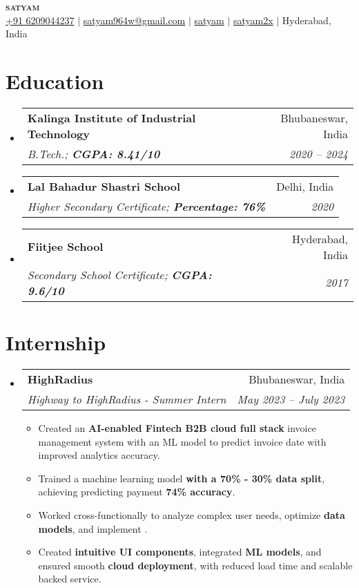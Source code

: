 \documentclass[letterpaper,10pt]{article}
\makeatletter
\newcommand{\resumeItem}[1]{
  \item\normalsize{
    {#1 \vspace{-2pt}}
  }
}
\newcommand{\resumeSubheading}[4]{
  \vspace{-2pt}\item
    \begin{tabular*}{0.97\textwidth}[t]{l@{\extracolsep{\fill}}r}
      \normalsize\textbf{#1} & \normalsize#2 \\
      \normalsize\textit{#3} & \normalsize\textit{#4} \\
    \end{tabular*}\vspace{-7pt}
}
\newcommand{\resumeEducationHeading}[4]{
  \vspace{-2pt}\item
    \begin{tabular*}{0.97\textwidth}[t]{l@{\extracolsep{\fill}}r}
      \normalsize\textbf{#1} & \normalsize#2 \\
      \normalsize\textit{#3} & \normalsize\textit{#4} \\
    \end{tabular*}\vspace{-5pt}
}
\newcommand{\resumeSubHeadingListStart}{\begin{itemize}[leftmargin=0.15in, label={}]}
\newcommand{\resumeSubHeadingListEnd}{\end{itemize}}
\newcommand{\resumeItemListStart}{\begin{itemize}}
\newcommand{\resumeItemListEnd}{\end{itemize}\vspace{-5pt}}
\makeatother
\begin{document}
\begin{center}
    \textbf{\Huge \scshape satyam} \\ \vspace{3pt}
    \normalsize
    \faMobile \hspace{.5pt} \href{tel:6209044237}{+91 6209044237}
    $|$
    \faAt \hspace{.5pt} \href{mailto:satyam964w@gmail.com}{satyam964w@gmail.com}
    $|$
    \faLinkedinSquare \hspace{.5pt} \href{https://www.linkedin.com/in/satyamw/}{satyam}
    $|$
    \faGithub \hspace{.5pt} \href{https://github.com/satyam2x}{satyam2x}
    $|$
    \faMapMarker \hspace{.5pt} Hyderabad, India

\end{center}

\section{Education}
  \vspace{1pt}
  \resumeSubHeadingListStart
    \resumeEducationHeading
      {Kalinga Institute of Industrial Technology}{Bhubaneswar, India}
      {B.Tech.; \textbf{CGPA: 8.41/10}}{2020 -- 2024}
    \resumeEducationHeading
      {Lal Bahadur Shastri School}{Delhi, India}
      {Higher Secondary Certificate; \textbf{Percentage: 76\%}}{2020}
      \resumeEducationHeading
      {Fiitjee School}{Hyderabad, India}
      {Secondary School Certificate; \textbf{CGPA: 9.6/10}}{2017}
  \resumeSubHeadingListEnd

\section{Internship}
  \vspace{3pt}
  \resumeSubHeadingListStart
  
    \resumeSubheading
      {HighRadius}{Bhubaneswar, India}
      {Highway to HighRadius - Summer Intern}{May 2023 -- July 2023}
        \resumeItemListStart
    \resumeItem{Created an \textbf{AI-enabled Fintech B2B cloud full stack} invoice management system with an ML model to predict invoice date with improved analytics accuracy.}
    \resumeItem{Trained a machine learning model \textbf{with a 70\% - 30\% data split}, achieving predicting payment \textbf{74\% accuracy}.}
    \resumeItem{Worked cross-functionally to analyze complex user needs, optimize \textbf{data models}, and implement .}
    \resumeItem{Created \textbf{intuitive UI components}, integrated \textbf{ML models}, and ensured smooth \textbf{cloud deployment}, with reduced load time and scalable backed service. }
\resumeItemListEnd
  \resumeSubHeadingListEnd
\end{document}
